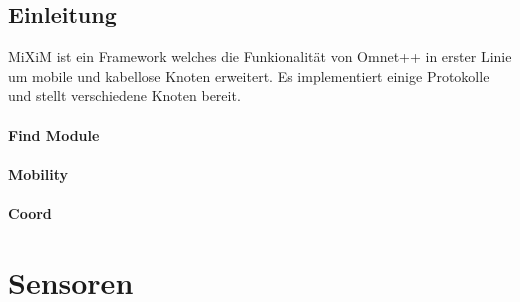 \subsection{Einleitung}

MiXiM\cite{mixim} ist ein Framework welches die Funkionalität von Omnet++ in erster Linie um mobile und kabellose Knoten erweitert. Es implementiert einige Protokolle und stellt verschiedene Knoten bereit.

\paragraph{Find Module}

\paragraph{Mobility}

\paragraph{Coord}

\section{Sensoren}
